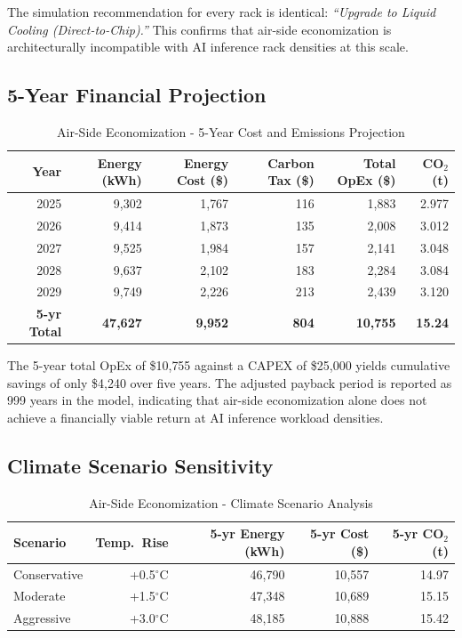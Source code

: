 ﻿\documentclass[12pt,a4paper]{report}
\newcommand{\degC}{$^{\circ}$C}
\begin{document}
\noindent The simulation recommendation for every rack is identical: \textit{``Upgrade to Liquid
Cooling (Direct-to-Chip).''} This confirms that air-side economization is architecturally
incompatible with AI inference rack densities at this scale.

\subsection{5-Year Financial Projection}

\begin{table}[H]
\centering
\small  %

\caption{Air-Side Economization - 5-Year Cost and Emissions Projection}
\label{tab:air_5yr}
\renewcommand{\arraystretch}{1.20}
\begin{tabular}{rrrrrr}
\toprule
\textbf{Year} & \textbf{Energy (kWh)} & \textbf{Energy Cost (\$)} & \textbf{Carbon Tax (\$)} & \textbf{Total OpEx (\$)} & \textbf{CO$_2$ (t)} \\
\midrule
2025 & 9{,}302  & 1{,}767 & 116  & 1{,}883 & 2.977 \\
2026 & 9{,}414  & 1{,}873 & 135  & 2{,}008 & 3.012 \\
2027 & 9{,}525  & 1{,}984 & 157  & 2{,}141 & 3.048 \\
2028 & 9{,}637  & 2{,}102 & 183  & 2{,}284 & 3.084 \\
2029 & 9{,}749  & 2{,}226 & 213  & 2{,}439 & 3.120 \\
\midrule
\textbf{5-yr Total} & \textbf{47{,}627} & \textbf{9{,}952} & \textbf{804} & \textbf{10{,}755} & \textbf{15.24} \\
\bottomrule
\end{tabular}
\end{table}

\noindent The 5-year total OpEx of \$10{,}755 against a CAPEX of \$25{,}000 yields cumulative
savings of only \$4{,}240 over five years. The adjusted payback period is reported as
999 years in the model, indicating that air-side economization alone does not achieve a
financially viable return at AI inference workload densities.

\subsection{Climate Scenario Sensitivity}

\begin{table}[H]
\centering
\caption{Air-Side Economization - Climate Scenario Analysis}
\label{tab:air_climate}
\renewcommand{\arraystretch}{1.35}
\begin{tabular}{lrrrr}
\toprule
\textbf{Scenario} & \textbf{Temp.\ Rise} & \textbf{5-yr Energy (kWh)} & \textbf{5-yr Cost (\$)} & \textbf{5-yr CO$_2$ (t)} \\
\midrule
Conservative & +0.5\degC & 46{,}790 & 10{,}557 & 14.97 \\
Moderate     & +1.5\degC & 47{,}348 & 10{,}689 & 15.15 \\
Aggressive   & +3.0\degC & 48{,}185 & 10{,}888 & 15.42 \\
\bottomrule
\end{tabular}
\end{table}
\end{document}
